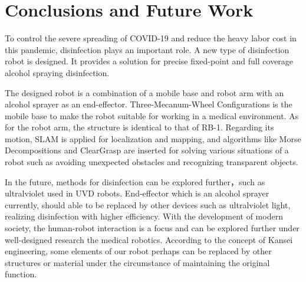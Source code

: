 \section{Conclusions and Future Work}\label{Sec:concl}
To control the severe spreading\cite{spreading} of COVID-19 and reduce the heavy labor cost in this pandemic, disinfection plays an important role. A new type of disinfection robot is designed. It provides a solution for precise fixed-point and full coverage alcohol spraying disinfection.

The designed robot is a combination of a mobile base and robot arm with an alcohol sprayer as an end-effector. Three-Mecanum-Wheel Configurations is the mobile base to make the robot suitable for working in a medical environment. As for the robot arm, the structure is identical to that of RB-1. Regarding its motion, SLAM is applied for localization and mapping, and algorithms like Morse Decompositions and ClearGrasp are inserted for solving various situations of a robot such as avoiding unexpected obstacles and recognizing transparent objects.

In the future, methods for disinfection can be explored further，such as ultralviolet used in UVD robots.\cite{FLEMING2018241} End-effector which is an alcohol sprayer currently, should able to be replaced by other devices such as ultralviolet light, realizing disinfection with higher efficiency.
With the development of modern society, the human-robot interaction is a focus and can be explored further under well-designed research the medical robotics.\cite{medicalkansei} According to the concept of Kansei engineering\cite{kansei}, some elements of our robot perhaps can be replaced by other structures or material under the circumstance of maintaining the original function. 